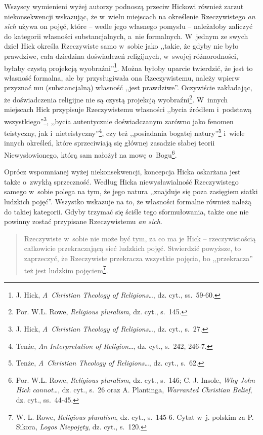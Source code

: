 Wszyscy wymienieni wyżej autorzy podnoszą przeciw Hickowi również zarzut niekonsekwencji wskazując, że w~wielu miejscach na określenie Rzeczywistego \textit{an sich} używa on pojęć, które -- wedle jego własnego pomysłu -- należałoby zaliczyć do kategorii własności substancjalnych, a~nie formalnych. W~jednym ze swych dzieł Hick określa Rzeczywiste samo w~sobie jako ,,takie, że gdyby nie było prawdziwe, cała dziedzina doświadczeń religijnych, w~swojej różnorodności, byłaby czystą projekcją wyobraźni''\footnote{J. Hick, \textit{A~Christian Theology of Religions}\ldots, dz. cyt., ss.~59-60.}. Można byłoby uparcie twierdzić, że jest to własność formalna, ale by przysługiwała ona Rzeczywistemu, należy wpierw przyznać mu (substancjalną) własność ,,jest prawdziwe''. Oczywiście zakładając, że doświadczenia religijne nie są czystą projekcją wyobraźni\footnote{Por. W.L. Rowe, \textit{Religious pluralism}, dz. cyt., s.~145.}. W~innych miejscach Hick przypisuje Rzeczywistemu własności ,,bycia źródłem i~podstawą wszystkiego''\footnote{J. Hick, \textit{A~Christian Theology of Religions}\ldots, dz. cyt., s.~27.}, ,,bycia autentycznie doświadczanym zarówno jako fenomen teistyczny, jak i~nieteistyczny''\footnote{Tenże, \textit{An Interpretation of Religion}\ldots, dz. cyt., s.~242, 246-7.}, czy też ,,posiadania bogatej natury''\footnote{Tenże, \textit{A~Christian Theology of Religions}\ldots, dz. cyt., s.~62.} i~wiele innych określeń, które sprzeciwiają się głównej zasadzie słabej teorii Niewysłowionego, którą sam nałożył na mowę o~Bogu\footnote{Por. W.L. Rowe, \textit{Religious pluralism}, dz. cyt., s.~146; C. J. Insole, \textit{Why John Hick cannot}\ldots, dz. cyt., s.~26 oraz A. Plantinga, \textit{Warranted Christian Belief}, dz. cyt., ss.~44-45.}.

Oprócz wspomnianej wyżej niekonsekwencji, koncepcja Hicka oskarżana jest także o~zwykłą sprzeczność. Według Hicka niewysławialność Rzeczywistego samego w~sobie polega na tym, że jego natura ,,znajduje się poza zasięgiem siatki ludzkich pojęć''. Wszystko wskazuje na to, że własności formalne również należą do takiej kategorii. Gdyby trzymać się ściśle tego sformułowania, także one nie powinny zostać przypisane Rzeczywistemu \textit{an sich}.

\begin{quote}
Rzeczywiste w~sobie nie może być tym, za co ma je Hick -- rzeczywistością całkowicie przekraczającą sieć ludzkich pojęć. Stwierdzić powyższe, to zaprzeczyć, że Rzeczywiste przekracza wszystkie pojęcia, bo ,,przekracza'' też jest ludzkim pojęciem\footnote{W. L. Rowe, \textit{Religious pluralism}, dz. cyt., s.~145-6. Cytat w~j. polskim za P. Sikora, \textit{Logos Niepojęty}, dz. cyt., s.~120.}.
\end{quote}

